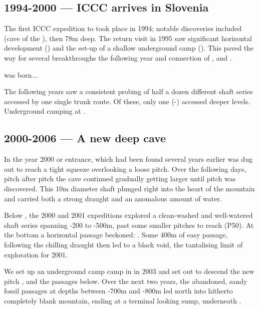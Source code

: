 \subsection{1994-2000 --- ICCC arrives in Slovenia} The first ICCC expedition to  took place in 1994; notable discoveries included  (cave of the ), then 78m deep. The return visit in 1995 saw significant horizontal development () and the set-up of a shallow underground camp (). This paved the way for several breakthroughs the following year and connection of ,  and . 

 was born...

The following years saw a consistent probing of half a dozen different shaft series accessed by one single trunk route. Of these, only one (-) accessed deeper levels. Underground camping at .

\subsection{2000-2006 --- A new deep cave} In the year 2000  or  entrance, which had been found several years earlier was dug out to reach a tight squeeze overlooking a loose pitch. Over the following days, pitch after pitch the cave continued gradually getting larger until  pitch was discovered. This 10m diameter shaft plunged right into the heart of the mountain and carried both a strong draught and an anomalous amount of water. 

Below , the 2000 and 2001 expeditions explored a clean-washed and well-watered shaft series spanning -200 to -500m, past some smaller pitches to reach  (P50). At the bottom a horizontal passage beckoned: . Some 400m of easy passage, following the chilling draught then led to a black void, the tantalising limit of exploration for 2001.
    
We set up an underground camp camp in  in 2003 and set out to descend the new pitch , and the passages below. Over the next two years, the abandoned, sandy fossil passages at depths between -700m and -800m led north into hitherto completely blank mountain, ending at a terminal looking sump, underneath .

